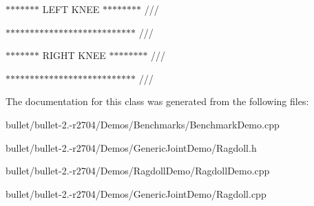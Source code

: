 $\ast$$\ast$$\ast$$\ast$$\ast$$\ast$$\ast$ L\+E\+F\+T K\+N\+E\+E $\ast$$\ast$$\ast$$\ast$$\ast$$\ast$$\ast$$\ast$ ///

$\ast$$\ast$$\ast$$\ast$$\ast$$\ast$$\ast$$\ast$$\ast$$\ast$$\ast$$\ast$$\ast$$\ast$$\ast$$\ast$$\ast$$\ast$$\ast$$\ast$$\ast$$\ast$$\ast$$\ast$$\ast$$\ast$$\ast$ ///

$\ast$$\ast$$\ast$$\ast$$\ast$$\ast$$\ast$ R\+I\+G\+H\+T K\+N\+E\+E $\ast$$\ast$$\ast$$\ast$$\ast$$\ast$$\ast$$\ast$ ///

$\ast$$\ast$$\ast$$\ast$$\ast$$\ast$$\ast$$\ast$$\ast$$\ast$$\ast$$\ast$$\ast$$\ast$$\ast$$\ast$$\ast$$\ast$$\ast$$\ast$$\ast$$\ast$$\ast$$\ast$$\ast$$\ast$$\ast$ /// 

The documentation for this class was generated from the following files\+:\begin{DoxyCompactItemize}
\item 
bullet/bullet-\/2.-\/r2704/\+Demos/\+Benchmarks/Benchmark\+Demo.\+cpp\item 
bullet/bullet-\/2.-\/r2704/\+Demos/\+Generic\+Joint\+Demo/Ragdoll.\+h\item 
bullet/bullet-\/2.-\/r2704/\+Demos/\+Ragdoll\+Demo/Ragdoll\+Demo.\+cpp\item 
bullet/bullet-\/2.-\/r2704/\+Demos/\+Generic\+Joint\+Demo/Ragdoll.\+cpp\end{DoxyCompactItemize}
